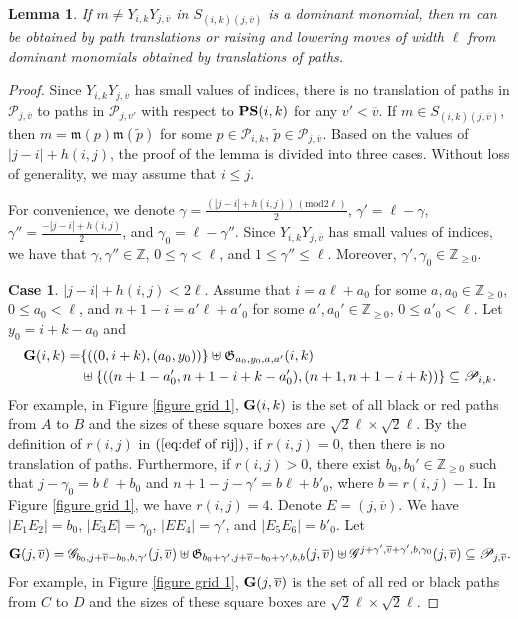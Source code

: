 \documentclass[12pt, reqno]{amsart}
\newtheorem{lemma}[theorem]{Lemma}
\numberwithin{equation}{section}
\newcommand{\ZZ}{\mathbb{Z}}
\begin{document}
{\begin{lemma}\label{Le:dominant is obtained by path translations or pairs of lowering and raising moves}
If $m \neq Y_{i,k}Y_{j,\overline{v}}$ in $S_{(i, k)(j, \overline{v})}$ is a dominant monomial, then $m$ can be obtained by path translations or raising and lowering moves of width $\ell$ from dominant monomials obtained by translations of paths.
\end{lemma}

\begin{proof}
Since $Y_{i,k}Y_{j,\overline{v}}$ has small values of indices, there is no translation of paths in $\mathscr{P}_{j,\overline{v}}$ to paths in $\mathscr{P}_{j,v'}$ with respect to ${\bf PS}(i,k)$ for any $v'<\overline{v}$. If $m\in S_{(i, k)(j, \overline{v})}$, then $m=\mathfrak{m}(p)\mathfrak{m}(\widetilde{p})$ for some $p\in \mathscr{P}_{i, k}$, $\widetilde{p}\in \mathscr{P}_{j, \overline{v}}$. Based on the values of $|j-i|+h(i,j)$, the proof of the lemma is divided into three cases. Without loss of generality, we may assume that $i\leq j$.

For convenience, we denote $\gamma=\frac{(|j-i|+h(i,j))\, (\text{mod} 2 \ell)}2$, $\gamma'=\ell-\gamma$, $\gamma''=\frac{-|j-i|+h(i,j)}2$, and $\gamma_0=\ell-\gamma''$. Since $Y_{i,k}Y_{j,\overline{v}}$ has small values of indices, we have that $\gamma,\gamma'' \in \ZZ$, $0\leq \gamma<\ell$, and $1\leq \gamma''\leq \ell$. Moreover, $\gamma', \gamma_0 \in \ZZ_{\geq 0}$.

\textbf{Case 1}. $|j-i|+h(i,j)< 2 \ell$. Assume that $i=a \ell+a_0$ for some $a, a_0\in \mathbb{Z}_{\geq 0}$, $0\leq a_0< \ell$, and $n+1-i=a' \ell+a'_0$ for some $a', a_0'\in \mathbb{Z}_{\geq 0}$, $0\leq a'_0< \ell$. Let $y_0=i+k-a_0$ and
\begin{align*}
{\bf G}(i,k)=&\{((0,i+k),(a_0,y_0))\}\uplus \mathfrak{G}_{a_0,y_0,a,a'}(i,k)\\
&\uplus \{((n+1-a'_0, n+1-i+k-a'_0),(n+1,n+1-i+k))\} \subseteq \mathscr{P}_{i, k}.
\end{align*}
For example, in Figure \ref{figure grid 1}, ${\bf G}(i,k)$ is the set of all black or red paths from $A$ to $B$ and the sizes of these square boxes are $\sqrt{2}\ell\times \sqrt{2}\ell$.
By the definition of $r(i,j)$ in $(\ref{eq:def of rij})$, if $r(i,j)=0$, then there is no translation of paths. Furthermore, if $r(i, j) > 0$, there exist $b_0, b_0' \in \ZZ_{\ge 0}$ such that $j-\gamma_0=b \ell+b_0$ and $n+1-j-\gamma'=b \ell+b'_0$, where $b=r(i,j)-1$. In Figure \ref{figure grid 1}, we have $r(i,j)=4$. Denote $E=(j,\overline{v})$. We have $|E_1E_2|=b_0$, $|E_3E|=\gamma_0$, $|EE_4|=\gamma'$, and $|E_5E_6|=b'_0$. Let
\begin{align*}
{\bf G}(j,\overline{v})=\mathscr{G}_{b_0, j+\overline{v}-b_0, b, \gamma'}(j,\overline{v})\uplus \mathfrak{G}_{b_0+\gamma',j+\overline{v}-b_0+ \gamma', b, b}(j,\overline{v}) \uplus \mathscr{G}^{j+\gamma', \overline{v}+\gamma', b, \gamma_0 }(j,\overline{v}) \subseteq \mathscr{P}_{j, \overline{v}}.
\end{align*}
For example, in Figure \ref{figure grid 1}, ${\bf G}(j,\overline{v})$ is the set of all red or black paths from $C$ to $D$ and the sizes of these square boxes are $\sqrt{2}\ell\times \sqrt{2}\ell$.


\end{proof}}
\end{document}

